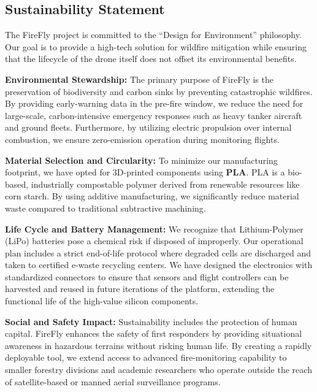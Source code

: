 \documentclass[journal, onecolumn]{IEEEtran}
\begin{document}
\subsection{Sustainability Statement}

The FireFly project is committed to the ``Design for Environment'' philosophy. Our goal is to provide a high-tech solution for wildfire mitigation while ensuring that the lifecycle of the drone itself does not offset its environmental benefits.

\vspace{1em}

\textbf{Environmental Stewardship:}
The primary purpose of FireFly is the preservation of biodiversity and carbon sinks by preventing catastrophic wildfires. By providing early-warning data in the pre-fire window, we reduce the need for large-scale, carbon-intensive emergency responses such as heavy tanker aircraft and ground fleets. Furthermore, by utilizing electric propulsion over internal combustion, we ensure zero-emission operation during monitoring flights.

\vspace{1em}

\textbf{Material Selection and Circularity:}
To minimize our manufacturing footprint, we have opted for 3D-printed components using \textbf{PLA}. PLA is a bio-based, industrially compostable polymer derived from renewable resources like corn starch. By using additive manufacturing, we significantly reduce material waste compared to traditional subtractive machining.

\vspace{1em}

\textbf{Life Cycle and Battery Management:}
We recognize that Lithium-Polymer (LiPo) batteries pose a chemical risk if disposed of improperly. Our operational plan includes a strict end-of-life protocol where degraded cells are discharged and taken to certified e-waste recycling centers. We have designed the electronics with standardized connectors to ensure that sensors and flight controllers can be harvested and reused in future iterations of the platform, extending the functional life of the high-value silicon components.

\vspace{1em}

\textbf{Social and Safety Impact:}
Sustainability includes the protection of human capital. FireFly enhances the safety of first responders by providing situational awareness in hazardous terrains without risking human life. By creating a rapidly deployable tool, we extend access to advanced fire-monitoring capability to smaller forestry divisions and academic researchers who operate outside the reach of satellite-based or manned aerial surveillance programs.
\end{document}
